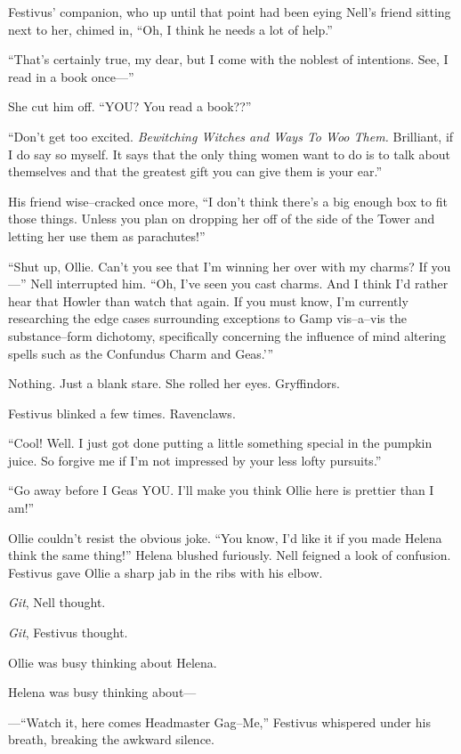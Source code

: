 Festivus’ companion, who up until that point had been eying Nell’s friend sitting next to her, chimed in, “Oh, I think he needs a lot of help.”

“That’s certainly true, my dear, but I come with the noblest of intentions. See, I read in a book once\mbox{---}”

She cut him off. “YOU? You read a book??”

“Don’t get too excited. \emph{Bewitching Witches and Ways To Woo Them.} Brilliant, if I do say so myself. It says that the only thing women want to do is to talk about themselves and that the greatest gift you can give them is your ear.”

His friend wise\mbox{--}cracked once more, “I don’t think there’s a big enough box to fit those things. Unless you plan on dropping her off of the side of the Tower and letting her use them as parachutes!”

“Shut up, Ollie. Can’t you see that I’m winning her over with my charms? If you\mbox{---}” Nell interrupted him. “Oh, I’ve seen you cast charms. And I think I’d rather hear that Howler than watch that again. If you must know, I’m currently researching the edge cases surrounding exceptions to Gamp vis\mbox{--}a\mbox{--}vis the substance\mbox{--}form dichotomy, specifically concerning the influence of mind altering spells such as the Confundus Charm and Geas.'”

Nothing. Just a blank stare. She rolled her eyes. Gryffindors.

Festivus blinked a few times. Ravenclaws.

“Cool! Well. I just got done putting a little something special in the pumpkin juice. So forgive me if I’m not impressed by your less lofty pursuits.”

“Go away before I Geas YOU. I’ll make you think Ollie here is prettier than I am!”

Ollie couldn’t resist the obvious joke. “You know, I’d like it if you made Helena think the same thing!” Helena blushed furiously. Nell feigned a look of confusion. Festivus gave Ollie a sharp jab in the ribs with his elbow.

\emph{Git}, Nell thought.

\emph{Git}, Festivus thought.

Ollie was busy thinking about Helena.

Helena was busy thinking about\mbox{---}

\mbox{---}“Watch it, here comes Headmaster Gag\mbox{--}Me,” Festivus whispered under his breath, breaking the awkward silence.

